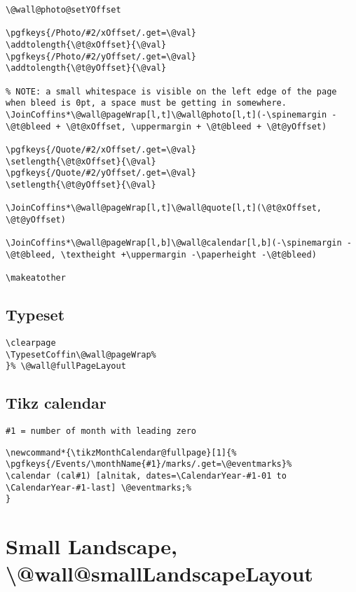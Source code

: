 \documentclass[11pt,oneside]{memoir-article}
\begin{document}
\begin{verbatim}
\@wall@photo@setYOffset

\pgfkeys{/Photo/#2/xOffset/.get=\@val}
\addtolength{\@t@xOffset}{\@val}
\pgfkeys{/Photo/#2/yOffset/.get=\@val}
\addtolength{\@t@yOffset}{\@val}

% NOTE: a small whitespace is visible on the left edge of the page when bleed is 0pt, a space must be getting in somewhere.
\JoinCoffins*\@wall@pageWrap[l,t]\@wall@photo[l,t](-\spinemargin -\@t@bleed + \@t@xOffset, \uppermargin + \@t@bleed + \@t@yOffset)

\pgfkeys{/Quote/#2/xOffset/.get=\@val}
\setlength{\@t@xOffset}{\@val}
\pgfkeys{/Quote/#2/yOffset/.get=\@val}
\setlength{\@t@yOffset}{\@val}

\JoinCoffins*\@wall@pageWrap[l,t]\@wall@quote[l,t](\@t@xOffset, \@t@yOffset)

\JoinCoffins*\@wall@pageWrap[l,b]\@wall@calendar[l,b](-\spinemargin -\@t@bleed, \textheight +\uppermargin -\paperheight -\@t@bleed)

\makeatother
\end{verbatim}

\subsection{Typeset}
\label{sec:orgafe47ba}

\begin{verbatim}
\clearpage
\TypesetCoffin\@wall@pageWrap%
}% \@wall@fullPageLayout
\end{verbatim}

\subsection{Tikz calendar}
\label{sec:org9549fc0}

\begin{verbatim}
#1 = number of month with leading zero
\end{verbatim}


\begin{verbatim}
\newcommand*{\tikzMonthCalendar@fullpage}[1]{%
\pgfkeys{/Events/\monthName{#1}/marks/.get=\@eventmarks}%
\calendar (cal#1) [alnitak, dates=\CalendarYear-#1-01 to \CalendarYear-#1-last] \@eventmarks;%
}
\end{verbatim}

\section{Small Landscape, \textbackslash @wall@smallLandscapeLayout}
\label{sec:orgdbef81d}
\end{document}
